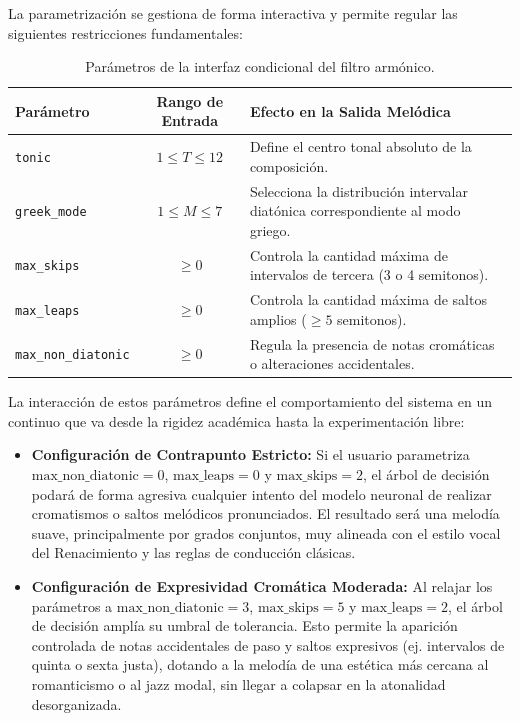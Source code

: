 \documentclass[12pt]{report}
\begin{document}
La parametrización se gestiona de forma interactiva y permite regular las siguientes restricciones fundamentales:
\begin{table}[H]
\centering
\caption{Parámetros de la interfaz condicional del filtro armónico.}
\label{tab:harmonic-filter-parameters}

\begin{tabular}{|l|c|p{8cm}|}
\hline
\textbf{Parámetro} &
\textbf{Rango de Entrada} &
\textbf{Efecto en la Salida Melódica}
\\ \hline

\texttt{tonic} &
$1 \leq T \leq 12$ &
Define el centro tonal absoluto de la composición.
\\ \hline

\texttt{greek\_mode} &
$1 \leq M \leq 7$ &
Selecciona la distribución intervalar diatónica correspondiente al modo griego.
\\ \hline

\texttt{max\_skips} &
$\geq 0$ &
Controla la cantidad máxima de intervalos de tercera (3 o 4 semitonos).
\\ \hline

\texttt{max\_leaps} &
$\geq 0$ &
Controla la cantidad máxima de saltos amplios ($\geq 5$ semitonos).
\\ \hline

\texttt{max\_non\_diatonic} &
$\geq 0$ &
Regula la presencia de notas cromáticas o alteraciones accidentales.
\\ \hline

\end{tabular}
\end{table}


La interacción de estos parámetros define el comportamiento del sistema en un continuo que va desde la rigidez académica hasta la experimentación libre:
\begin{itemize}
    \item \textbf{Configuración de Contrapunto Estricto:} Si el usuario parametriza $\text{max\_non\_diatonic} = 0$, $\text{max\_leaps} = 0$ y $\text{max\_skips} = 2$, el árbol de decisión podará de forma agresiva cualquier intento del modelo neuronal de realizar cromatismos o saltos melódicos pronunciados. El resultado será una melodía suave, principalmente por grados conjuntos, muy alineada con el estilo vocal del Renacimiento y las reglas de conducción clásicas.
    
    \item \textbf{Configuración de Expresividad Cromática Moderada:} Al relajar los parámetros a $\text{max\_non\_diatonic} = 3$, $\text{max\_skips} = 5$ y $\text{max\_leaps} = 2$, el árbol de decisión amplía su umbral de tolerancia. Esto permite la aparición controlada de notas accidentales de paso y saltos expresivos (ej. intervalos de quinta o sexta justa), dotando a la melodía de una estética más cercana al romanticismo o al jazz modal, sin llegar a colapsar en la atonalidad desorganizada.
\end{itemize}
\end{document}
